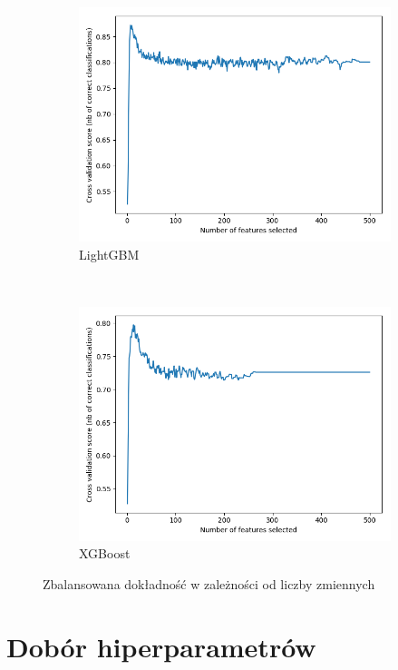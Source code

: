 \documentclass[a4paper,12pt]{article}
\begin{document}
    \begin{figure}[h!]
        \centering
        \begin{subfigure}{0.5\linewidth}
            \centering
            \includegraphics[width=0.9\linewidth]{../images/lightgbm-rfe-cv.png}
            \caption{LightGBM}
        \end{subfigure}%
        ~
        \begin{subfigure}{0.5\linewidth}
            \centering
            \includegraphics[width=0.9\linewidth]{../images/xgboost-rfe-cv.png}
            \caption{XGBoost}
        \end{subfigure}
        \caption{Zbalansowana dokładność w zależności od liczby zmiennych}
        \label{fig:rfe-cv-comparison}
    \end{figure}

    \section{Dobór hiperparametrów}
\end{document}
